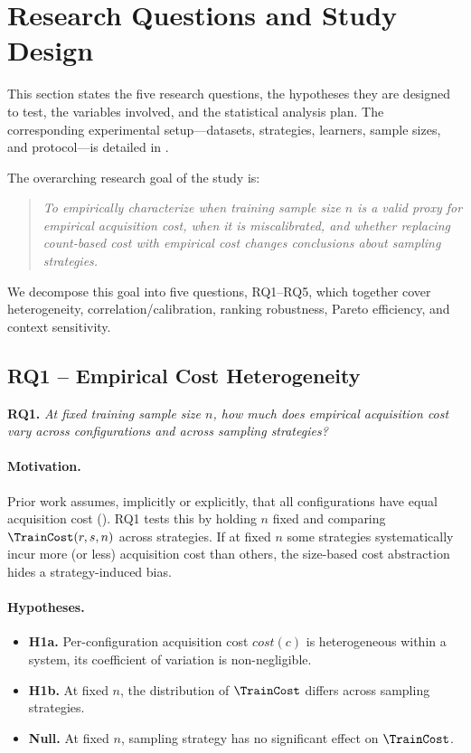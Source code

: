 \section{Research Questions and Study Design}
\label{sec:study_design}

This section states the five research questions, the hypotheses they are
designed to test, the variables involved, and the statistical analysis plan.
The corresponding experimental setup---datasets, strategies, learners, sample
sizes, and protocol---is detailed in .

The overarching research goal of the study is:
\begin{quote}
\emph{To empirically characterize when training sample size $n$ is a valid
proxy for empirical acquisition cost, when it is miscalibrated, and whether
replacing count-based cost with empirical cost changes conclusions about
sampling strategies.}
\end{quote}
We decompose this goal into five questions, RQ1--RQ5, which together cover
heterogeneity, correlation/calibration, ranking robustness, Pareto efficiency,
and context sensitivity.

\subsection{RQ1 -- Empirical Cost Heterogeneity}
\label{subsec:rq1}

\textbf{RQ1.} \emph{At fixed training sample size $n$, how much does
empirical acquisition cost vary across configurations and across sampling
strategies?}

\paragraph*{Motivation.}
Prior work assumes, implicitly or explicitly, that all configurations have
equal acquisition cost (). RQ1 tests this by
holding $n$ fixed and comparing $\TrainCost(r,s,n)$ across strategies. If
at fixed $n$ some strategies systematically incur more (or less)
acquisition cost than others, the size-based cost abstraction hides a
strategy-induced bias.

\paragraph*{Hypotheses.}
\begin{itemize}
    \item \textbf{H1a.} Per-configuration acquisition cost
    $\mathit{cost}(c)$ is heterogeneous within a system, \ie its
    coefficient of variation is non-negligible.
    \item \textbf{H1b.} At fixed $n$, the distribution of $\TrainCost$ differs
    across sampling strategies.
    \item \textbf{Null.} At fixed $n$, sampling strategy has no significant
    effect on $\TrainCost$.
\end{itemize}

